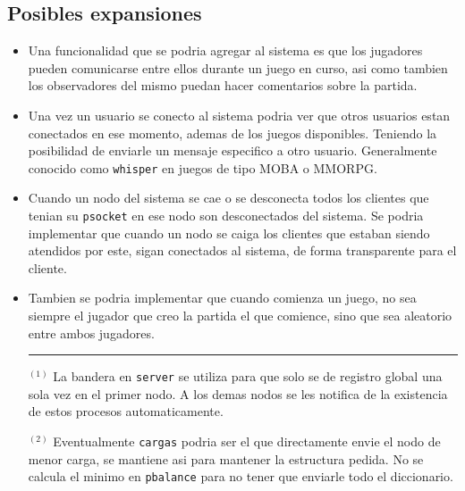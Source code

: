 \documentclass[a4paper]{article}
\newcommand{\blacktr}[0]{\item[$\blacktriangleright$]}
\begin{document}
\subsection*{Posibles expansiones}
\begin{itemize}
  \blacktr Una funcionalidad que se podria agregar al sistema es que los jugadores pueden comunicarse entre ellos durante un juego en curso, asi como tambien los observadores del mismo puedan hacer comentarios sobre la partida.

  \blacktr Una vez un usuario se conecto al sistema podria ver que otros usuarios estan conectados en ese momento, ademas de los juegos disponibles. Teniendo la posibilidad de enviarle un mensaje especifico a otro usuario. Generalmente conocido como \texttt{whisper} en juegos de tipo MOBA o MMORPG.

  \blacktr Cuando un nodo del sistema se cae o se desconecta todos los clientes que tenian su \texttt{psocket} en ese nodo son desconectados del sistema. Se podria implementar que cuando un nodo se caiga los clientes que estaban siendo atendidos por este, sigan conectados al sistema, de forma transparente para el cliente.

  \blacktr Tambien se podria implementar que cuando comienza un juego, no sea siempre el jugador que creo la partida el que comience, sino que sea aleatorio entre ambos jugadores.




\rule{18cm}{0.4pt}
$^{(1)}$ La bandera en \texttt{server} se utiliza para que solo se de registro global una sola vez en el primer nodo. A los demas nodos se les notifica de la existencia de estos procesos automaticamente.

$^{(2)}$ Eventualmente \texttt{cargas} podria ser el que directamente envie el nodo de menor carga, se mantiene asi para mantener la estructura pedida. No se calcula el minimo en \texttt{pbalance} para no tener que enviarle todo el diccionario.
\end{itemize}
\end{document}
